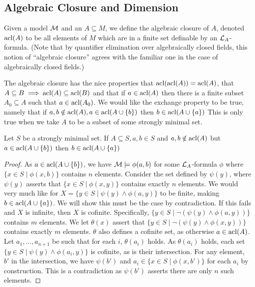 \subsection{Algebraic Closure and Dimension}

\begin{definition}\label{definition_algebraic_closure}
Given a model \(\mathcal{M}\) and an \(A \subseteq M\), we define the algebraic closure of \(A\), denoted \(\text{acl}(A)\) to be all elements of \(M\) which are in a finite set definable by an \(\mathcal{L}_A\)-formula. 
(Note that by quantifier elimination over algebraically closed fields, this notion of ``algebraic closure'' agrees with the familiar one in the case of algebraically closed fields.)
\end{definition}

The algebraic closure has the nice properties that \(\text{acl}(\text{acl}(A)) = \text{acl}(A)\), that \(A \subseteq B \implies \text{acl}(A) \subseteq \text{acl}(B)\) and that if \(a \in \text{acl}(A)\) then there is a finite subset \(A_0 \subseteq A\) such that \(a \in \text{acl}(A_0)\).
We would like the exchange property to be true, namely that if \(a, b \notin \text{acl}(A), a \in \text{acl}(A \cup \{b\})\) then \(b \in \text{acl}(A \cup \{a\})\) 
This is only true when we take \(A\) to be a subset of some strongly minimal set.

\begin{theorem}\label{theorem_exchange}
Let \(S\) be a strongly minimal set. If \(A \subseteq S, a, b \in S\) and \(a, b \notin \text{acl}(A)\) but \(a \in \text{acl}(A \cup \{b\})\) then \(b \in \text{acl}(A \cup \{a\})\) 
\end{theorem}

\begin{proof}
As \(a \in \text{acl}(A \cup \{b\})\), we have \(\mathcal{M} \models \phi(a, b)\) for some \(\mathcal{L}_A\)-formula 
\(\phi\) where \(\{x \in S \mid \phi(x, b)\}\) contains \(n\) elements. 
Consider the set defined by \(\psi(y)\), where \(\psi(y)\) asserts that \(\{x \in S \mid \phi(x, y)\}\) contains exactly \(n\) elements. 
We would very much like for \(X = \{y \in S \mid \psi(y) \land \phi(a, y)\}\) to be finite, making \(b \in \text{acl}(A \cup \{a\})\). 
We will show this must be the case by contradiction.
If this fails and \(X\) is infinite, then \(X\) is cofinite. 
Specifically, \(\{y \in S \mid \neg(\psi(y) \land \phi(a, y))\}\) contains \(m\) elements.  
We let \(\theta(x)\) assert that \(\{y \in S \mid \neg(\psi(y) \land \phi(x, y))\}\) contains exactly \(m\) elements.
\(\theta\) also defines a cofinite set, as otherwise \(a \in \text{acl}(A)\).   
Let \(a_1, \ldots, a_{n+1}\) be such that for each \(i\), \(\theta(a_i)\) holds.
As \(\theta(a_i)\) holds, each set \(\{y \in S \mid \psi(y) \land \phi(a_i, y)\}\) is cofinite, as is their intersection. 
For any element, \(b'\) in the intersection, we have \(\psi(b')\) and \(a_i \in \{x \in S \mid \phi(x, b')\}\) for each \(a_i\) by construction.
This is a contradiction as \(\psi(b')\) asserts there are only \(n\) such elements.  
\end{proof}

